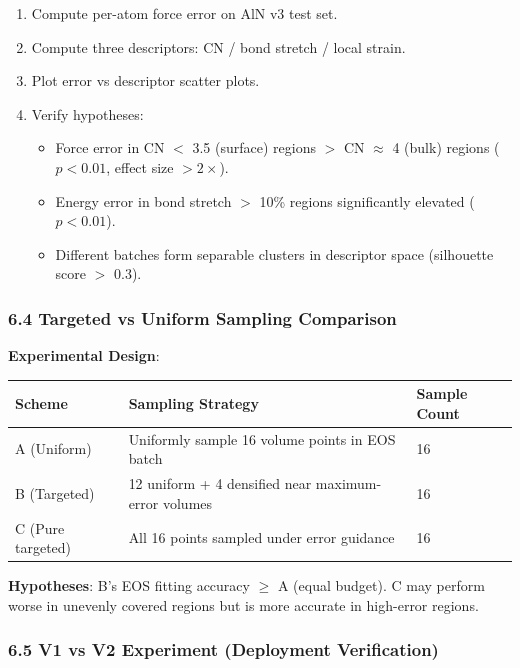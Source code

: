 \documentclass[
  12pt,
]{article}
\providecommand{\tightlist}{%
  \setlength{\itemsep}{0pt}\setlength{\parskip}{0pt}}
\begin{document}
\begin{enumerate}
\def\labelenumi{\arabic{enumi}.}
\tightlist
\item
  Compute per-atom force error on AlN v3 test set.
\item
  Compute three descriptors: CN / bond stretch / local strain.
\item
  Plot error vs descriptor scatter plots.
\item
  Verify hypotheses:

  \begin{itemize}
  \tightlist
  \item
    Force error in CN $<$ 3.5 (surface) regions $>$ CN $\approx$ 4 (bulk) regions ($p < 0.01$, effect size $> 2\times$).
  \item
    Energy error in bond stretch $>$ 10\% regions significantly elevated ($p < 0.01$).
  \item
    Different batches form separable clusters in descriptor space (silhouette score $>$ 0.3).
  \end{itemize}
\end{enumerate}

\subsubsection{6.4 Targeted vs Uniform Sampling Comparison}\label{targeted-vs-uniform}

\textbf{Experimental Design}:

\begin{longtable}[]{@{}lll@{}}
\toprule\noalign{}
Scheme & Sampling Strategy & Sample Count \\
\midrule\noalign{}
\endhead
\bottomrule\noalign{}
\endlastfoot
A (Uniform) & Uniformly sample 16 volume points in EOS batch & 16 \\
B (Targeted) & 12 uniform + 4 densified near maximum-error volumes & 16 \\
C (Pure targeted) & All 16 points sampled under error guidance & 16 \\
\end{longtable}

\textbf{Hypotheses}: B's EOS fitting accuracy $\geq$ A (equal budget). C may perform worse in unevenly covered regions but is more accurate in high-error regions.

\subsubsection{6.5 V1 vs V2 Experiment (Deployment Verification)}\label{v1-vs-v2-experiment}
\end{document}
